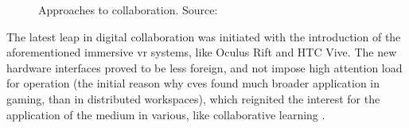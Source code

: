 \begin{figure}
	\centering
	\hfill
	\hfill
	\hfill
	\caption{Approaches to collaboration. Source: \parencite{churchill_collaborative_1998}}
	\label{fig:approaches_to_collaboration}
\end{figure}

The latest leap in digital collaboration was initiated with the introduction of the aforementioned immersive \gls{vr} systems, like Oculus Rift and HTC Vive. The new hardware interfaces proved to be less foreign, and not impose high attention load for operation (the initial reason why \gls{cve}s found much broader application in gaming, than in distributed workspaces), which reignited the interest for the application of the medium in various, like collaborative learning \parencite{greenwald_cocoverse_nodate}. 


